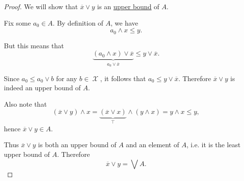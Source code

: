 \begin{proof}
  We will show that \( \overline x \vee y \) is an \hyperref[def:poset_extremal_points/upper_and_lower_bounds]{upper bound} of \( A \).

  Fix some \( a_0 \in A \). By definition of \( A \), we have
  \begin{equation*}
    a_0 \wedge x \leq y.
  \end{equation*}

  But this means that
  \begin{equation*}
    \underbrace{(a_0 \wedge x) \vee \overline x}_{a_0 \vee \overline x} \leq y \vee \overline x.
  \end{equation*}

  Since \( a_0 \leq a_0 \vee b \) for any \( b \in \mscrX \), it follows that \( a_0 \leq y \vee \overline x \). Therefore \( \overline x \vee y \) is indeed an upper bound of \( A \).

  Also note that
  \begin{equation*}
    (\overline x \vee y) \wedge x = \underbrace{(\overline x \vee x)}_{\top} \wedge (y \wedge x) = y \wedge x \leq y,
  \end{equation*}
  hence \( \overline x \vee y \in A \).

  Thus \( \overline x \vee y \) is both an upper bound of \( A \) and an element of \( A \), i.e. it is the least upper bound of \( A \). Therefore
  \begin{equation*}
    \overline x \vee y = \bigvee A.
  \end{equation*}
\end{proof}

